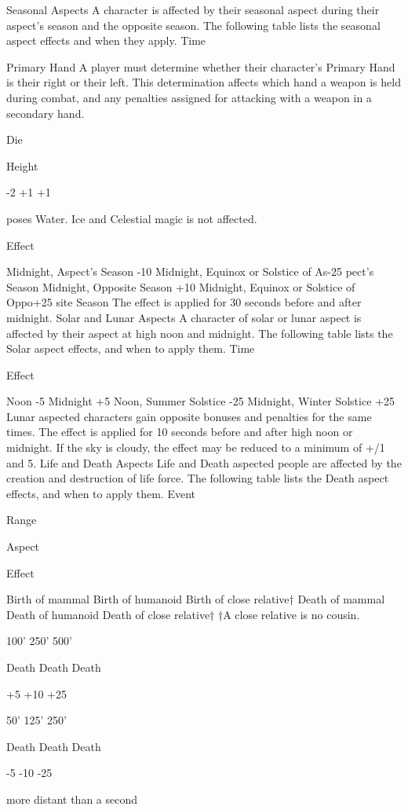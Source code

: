 \documentclass[a4paper]{article}
\begin{document}
\begin{multicols}{3}
Seasonal Aspects
A character is affected by their seasonal aspect
during their aspect’s season and the opposite season. The following table lists the seasonal aspect
effects and when they apply.
Time

Primary Hand
A player must determine whether their character’s
Primary Hand is their right or their left. This determination affects which hand a weapon is held
during combat, and any penalties assigned for
attacking with a weapon in a secondary hand.

Die

Height

-2
+1
+1

poses Water. Ice and Celestial magic is not affected.

Effect

Midnight, Aspect’s Season
-10
Midnight, Equinox or Solstice of As-25
pect’s Season
Midnight, Opposite Season
+10
Midnight, Equinox or Solstice of Oppo+25
site Season
The effect is applied for 30 seconds before and
after midnight.
Solar and Lunar Aspects
A character of solar or lunar aspect is affected by
their aspect at high noon and midnight. The following table lists the Solar aspect effects, and when to
apply them.
Time

Effect

Noon
-5
Midnight
+5
Noon, Summer Solstice
-25
Midnight, Winter Solstice +25
Lunar aspected characters gain opposite bonuses
and penalties for the same times. The effect is
applied for 10 seconds before and after high noon
or midnight. If the sky is cloudy, the effect may be
reduced to a minimum of +/1 and 5.
Life and Death Aspects
Life and Death aspected people are affected by the
creation and destruction of life force.
The following table lists the Death aspect effects,
and when to apply them.
Event

Range

Aspect

Effect

Birth of mammal
Birth of humanoid
Birth of close relative†
Death of mammal
Death of humanoid
Death of close relative†
†A close relative is no
cousin.

100’
250’
500’

Death
Death
Death

+5
+10
+25

50’
125’
250’

Death
Death
Death

-5
-10
-25

more distant than a second


\end{multicols}
\end{document}
